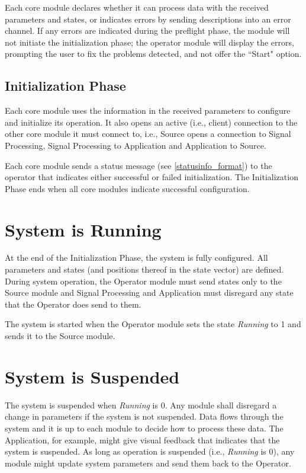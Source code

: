 \documentclass[letterpaper,oneside,12pt]{book}
\begin{document}
Each core module declares whether it can process data with the received
parameters and states, or indicates errors by sending descriptions into
an error channel. If any errors are indicated during the preflight phase,
the module will not initiate the initialization phase; the operator module
will display the errors, prompting the user to fix the problems detected, 
and not offer the ``Start" option.

\subsection{Initialization Phase}

Each core module uses the information in the received parameters to configure and 
initialize its operation. It also opens an active (i.e., client) connection 
to the other core module it must connect to, i.e., Source opens a 
connection to Signal Processing, Signal Processing to Application and 
Application to Source.

Each core module sends a status message (see \ref{statusinfo_format}) to the 
operator that indicates either successful or failed initialization. The 
Initialization Phase ends when all core modules indicate successful 
configuration.


\section{System is Running}
\label{system_performance}

At the end of the Initialization Phase, the system is fully configured. All 
parameters and states (and positions thereof in the state vector) are defined. 
During system operation, the Operator module must send states only to the Source 
module and Signal Processing and Application must disregard any state that the 
Operator does send to them. 

The system is started when the Operator module sets the state \textit{Running} 
to 1 and sends it to the Source module. 


\section{System is Suspended}
\label{sec:system_suspended}

The system is suspended when \textit{Running} is 0. Any module shall disregard a 
change in parameters if the system is not suspended. Data flows through the 
system and it is up to each module to decide how to process these data. The 
Application, for example, might give visual feedback that indicates that the 
system is suspended. As long as operation is suspended (i.e., \textit{Running} 
is 0), any module might update system parameters and send them back to the 
Operator.
\end{document}
